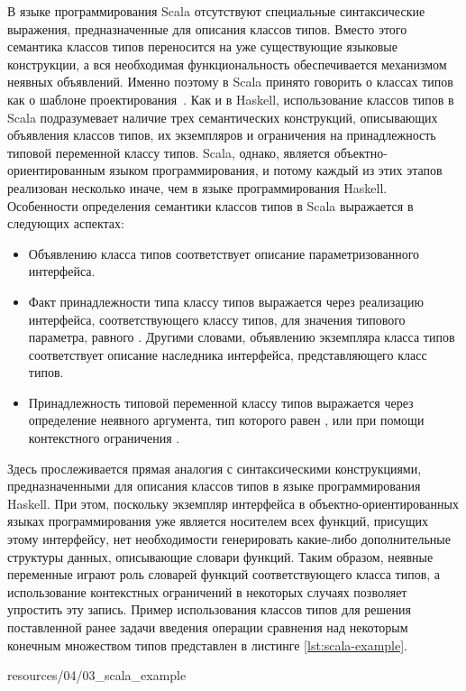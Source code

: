 В языке программирования Scala отсутствуют специальные синтаксические выражения, предназначенные для описания классов типов. Вместо этого семантика классов типов переносится на уже существующие языковые конструкции, а вся необходимая функциональность обеспечивается механизмом неявных объявлений. Именно поэтому в Scala принято говорить о классах типов как о шаблоне проектирования~\cite{Odersky06}. Как и в Haskell, использование классов типов в Scala подразумевает наличие трех семантических конструкций, описывающих объявления классов типов, их экземпляров и ограничения на принадлежность типовой переменной классу типов. Scala, однако, является объектно-ориентированным языком программирования, и потому каждый из этих этапов реализован несколько иначе, чем в языке программирования Haskell. Особенности определения семантики классов типов в Scala выражается в следующих аспектах:
\begin{itemize}
    \item Объявлению класса типов соответствует описание параметризованного интерфейса. 
    \item Факт принадлежности типа  классу типов выражается через реализацию интерфейса, соответствующего классу типов, для значения типового параметра, равного . Другими словами, объявлению экземпляра класса типов соответствует описание наследника интерфейса, представляющего класс типов.  
    \item Принадлежность типовой переменной  классу типов  выражается через определение неявного аргумента, тип которого равен , или при помощи контекстного ограничения .    
\end{itemize}
Здесь прослеживается прямая аналогия с синтаксическими конструкциями, предназначенными для описания классов типов в языке программирования Haskell. При этом, поскольку экземпляр интерфейса в объектно-ориентированных языках программирования уже является носителем всех функций, присущих этому интерфейсу, нет необходимости генерировать какие-либо дополнительные структуры данных, описывающие словари функций. Таким образом, неявные переменные играют роль словарей функций соответствующего класса типов, а использование контекстных ограничений в некоторых случаях позволяет упростить эту запись. Пример использования классов типов для решения поставленной ранее задачи введения операции сравнения над некоторым конечным множеством типов представлен в листинге \ref{lst:scala-example}.


{resources/04/03_scala_example}

